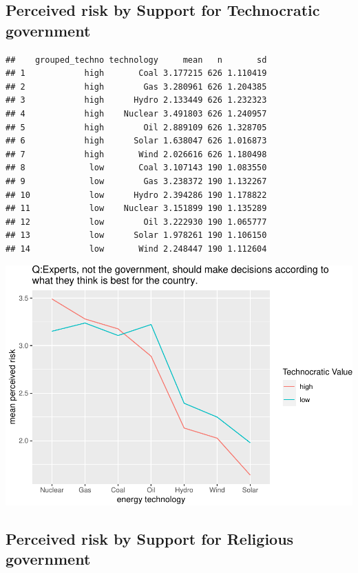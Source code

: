 \documentclass[
]{article}
\begin{document}
\newpage

\hypertarget{perceived-risk-by-support-for-technocratic-government}{%
\subsection{Perceived risk by Support for Technocratic
government}\label{perceived-risk-by-support-for-technocratic-government}}

\begin{verbatim}
##    grouped_techno technology     mean   n       sd
## 1            high       Coal 3.177215 626 1.110419
## 2            high        Gas 3.280961 626 1.204385
## 3            high      Hydro 2.133449 626 1.232323
## 4            high    Nuclear 3.491803 626 1.240957
## 5            high        Oil 2.889109 626 1.328705
## 6            high      Solar 1.638047 626 1.016873
## 7            high       Wind 2.026616 626 1.180498
## 8             low       Coal 3.107143 190 1.083550
## 9             low        Gas 3.238372 190 1.132267
## 10            low      Hydro 2.394286 190 1.178822
## 11            low    Nuclear 3.151899 190 1.135289
## 12            low        Oil 3.222930 190 1.065777
## 13            low      Solar 1.978261 190 1.106150
## 14            low       Wind 2.248447 190 1.112604
\end{verbatim}

\includegraphics{Significant_results_files/figure-latex/unnamed-chunk-21-1.pdf}

\newpage

\hypertarget{perceived-risk-by-support-for-religious-government}{%
\subsection{Perceived risk by Support for Religious
government}\label{perceived-risk-by-support-for-religious-government}}
\end{document}
